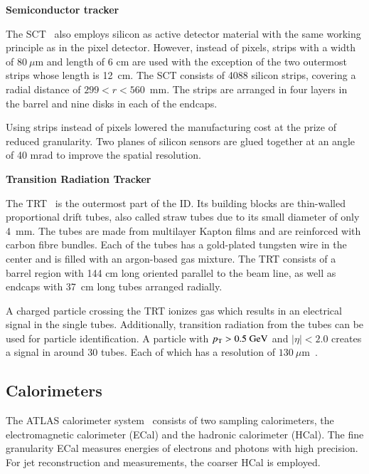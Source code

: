 \vspace{.5cm}
\noindent
\textbf{Semiconductor tracker}
\vspace{.5cm}

\noindent
The SCT~\cite{IDET-2013-01} also employs silicon as active detector material with the same working principle as in the pixel detector.
However, instead of pixels, strips with a width of $80~\mu$m and length of 6 cm are used with the exception of the two outermost strips whose length is 12~cm.
The SCT consists of 4088 silicon strips, covering a radial distance of $299<r<560$~mm.
The strips are arranged in four layers in the barrel
and nine disks in each of the endcaps.

Using strips instead of pixels lowered the manufacturing cost at the prize of reduced granularity.
Two planes of silicon sensors are glued together at an angle of 40 mrad to improve the spatial resolution.

\vspace{.5cm}
\noindent
\textbf{Transition Radiation Tracker}
\vspace{.5cm}

\noindent
The TRT~\cite{ATLAS_TRT_TDR} is the outermost part of the ID.
Its building blocks are thin-walled proportional drift tubes, also called straw tubes due to its small diameter of only 4~mm.
The tubes are made from multilayer Kapton films and are reinforced with carbon fibre bundles.
Each of the tubes has a gold-plated tungsten wire in the center and is filled with an argon-based gas mixture.
The TRT consists of a barrel region with 144 cm long oriented parallel to the beam line, as well as endcaps with 37~cm long tubes arranged radially. 

A charged particle crossing the TRT ionizes gas which results in an electrical signal in the single tubes.
Additionally, transition radiation from the tubes can be used for particle identification.
A particle with $p_{\text{T}} > 0.5~\text{GeV}$ and $|\eta|<2.0$ creates a signal in around 30 tubes.
Each of which has a resolution of $130~\mu$m~\cite{MINDUR2017257}.

\subsection{Calorimeters}

The ATLAS calorimeter system~\cite{ATLAS-TDR-01} consists of two sampling calorimeters, the electromagnetic calorimeter (ECal) and the hadronic calorimeter (HCal).
The fine granularity ECal measures energies of electrons and photons with high precision.
For jet reconstruction and \ETmiss measurements, the coarser HCal is employed.

